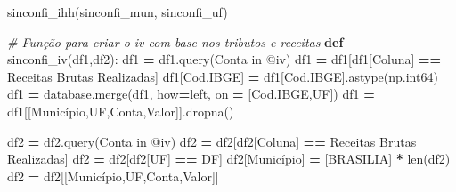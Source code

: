 \documentclass[
  12,
  dvipsnames]{article}
\newenvironment{Shaded}{\begin{snugshade}}{\end{snugshade}}
\newcommand{\BuiltInTok}[1]{#1}
\newcommand{\CommentTok}[1]{\textcolor[rgb]{0.56,0.35,0.01}{\textit{#1}}}
\newcommand{\KeywordTok}[1]{\textcolor[rgb]{0.13,0.29,0.53}{\textbf{#1}}}
\newcommand{\NormalTok}[1]{#1}
\newcommand{\OperatorTok}[1]{\textcolor[rgb]{0.81,0.36,0.00}{\textbf{#1}}}
\newcommand{\StringTok}[1]{\textcolor[rgb]{0.31,0.60,0.02}{#1}}
\begin{document}
\begin{Shaded}
\begin{Highlighting}[]
\NormalTok{sinconfi\_ihh(sinconfi\_mun, sinconfi\_uf)}

\CommentTok{\# Função para criar o iv com base nos tributos e receitas }
\KeywordTok{def}\NormalTok{ sinconfi\_iv(df1,df2):}
\NormalTok{    df1 }\OperatorTok{=}\NormalTok{ df1.query(}\StringTok{\textquotesingle{}Conta in @iv\textquotesingle{}}\NormalTok{)}
\NormalTok{    df1 }\OperatorTok{=}\NormalTok{ df1[df1[}\StringTok{\textquotesingle{}Coluna\textquotesingle{}}\NormalTok{] }\OperatorTok{==} \StringTok{\textquotesingle{}Receitas Brutas Realizadas\textquotesingle{}}\NormalTok{]}
\NormalTok{    df1[}\StringTok{\textquotesingle{}Cod.IBGE\textquotesingle{}}\NormalTok{] }\OperatorTok{=}\NormalTok{ df1[}\StringTok{\textquotesingle{}Cod.IBGE\textquotesingle{}}\NormalTok{].astype(np.int64)}
\NormalTok{    df1 }\OperatorTok{=}\NormalTok{ database.merge(df1, how}\OperatorTok{=}\StringTok{\textquotesingle{}left\textquotesingle{}}\NormalTok{, on }\OperatorTok{=}\NormalTok{ [}\StringTok{\textquotesingle{}Cod.IBGE\textquotesingle{}}\NormalTok{,}\StringTok{\textquotesingle{}UF\textquotesingle{}}\NormalTok{])}
\NormalTok{    df1 }\OperatorTok{=}\NormalTok{ df1[[}\StringTok{\textquotesingle{}Município\textquotesingle{}}\NormalTok{,}\StringTok{\textquotesingle{}UF\textquotesingle{}}\NormalTok{,}\StringTok{\textquotesingle{}Conta\textquotesingle{}}\NormalTok{,}\StringTok{\textquotesingle{}Valor\textquotesingle{}}\NormalTok{]].dropna()}

\NormalTok{    df2 }\OperatorTok{=}\NormalTok{ df2.query(}\StringTok{\textquotesingle{}Conta in @iv\textquotesingle{}}\NormalTok{)}
\NormalTok{    df2 }\OperatorTok{=}\NormalTok{ df2[df2[}\StringTok{\textquotesingle{}Coluna\textquotesingle{}}\NormalTok{] }\OperatorTok{==} \StringTok{\textquotesingle{}Receitas Brutas Realizadas\textquotesingle{}}\NormalTok{]}
\NormalTok{    df2 }\OperatorTok{=}\NormalTok{ df2[df2[}\StringTok{\textquotesingle{}UF\textquotesingle{}}\NormalTok{] }\OperatorTok{==} \StringTok{\textquotesingle{}DF\textquotesingle{}}\NormalTok{]}
\NormalTok{    df2[}\StringTok{\textquotesingle{}Município\textquotesingle{}}\NormalTok{] }\OperatorTok{=}\NormalTok{ [}\StringTok{\textquotesingle{}BRASILIA\textquotesingle{}}\NormalTok{] }\OperatorTok{*} \BuiltInTok{len}\NormalTok{(df2)}
\NormalTok{    df2 }\OperatorTok{=}\NormalTok{ df2[[}\StringTok{\textquotesingle{}Município\textquotesingle{}}\NormalTok{,}\StringTok{\textquotesingle{}UF\textquotesingle{}}\NormalTok{,}\StringTok{\textquotesingle{}Conta\textquotesingle{}}\NormalTok{,}\StringTok{\textquotesingle{}Valor\textquotesingle{}}\NormalTok{]]}


\end{Highlighting}
\end{Shaded}
\end{document}
